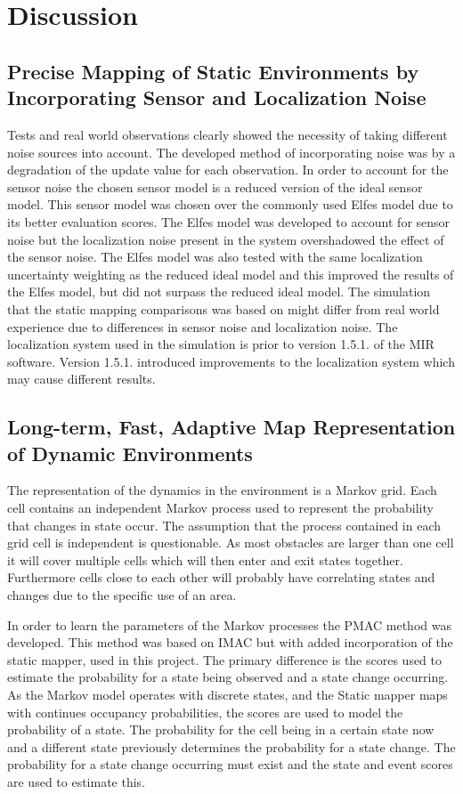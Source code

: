 \section{Discussion}

 

\subsection{Precise Mapping of Static Environments by Incorporating Sensor and Localization Noise}
Tests and real world observations clearly showed the necessity of taking different noise sources into account. 
The developed method of incorporating noise was by a degradation of the update value for each observation. 
In order to account for the sensor noise the chosen sensor model is a reduced version of the ideal sensor model. 
This sensor model was chosen over the commonly used Elfes model due to its better evaluation scores. 
The Elfes model was developed to account for sensor noise but the localization noise present in the system overshadowed the effect of the sensor noise. 
The Elfes model was also tested with the same localization uncertainty weighting as the reduced ideal model and this improved the results of the Elfes model, but did not surpass the reduced ideal model. 
The simulation that the static mapping comparisons was based on might differ from real world experience due to differences in sensor noise and localization noise. 
The localization system used in the simulation is prior to version 1.5.1. of the MIR software. 
Version 1.5.1. introduced improvements to the localization system which may cause different results. 

\subsection{Long-term, Fast, Adaptive Map Representation of Dynamic Environments}
The representation of the dynamics in the environment is a Markov grid. 
Each cell contains an independent Markov process used to represent the probability that changes in state occur. 
The assumption that the process contained in each grid cell is independent is questionable. 
As most obstacles are larger than one cell it will cover multiple cells which will then enter and exit states together. 
Furthermore cells close to each other will probably have correlating states and changes due to the specific use of an area. 

In order to learn the parameters of the Markov processes the PMAC method was developed. 
This method was based on IMAC but with added incorporation of the static mapper, used in this project. 
The primary difference is the scores used to estimate the probability for a state being observed and a state change occurring.
As the Markov model operates with discrete states, and the Static mapper maps with continues occupancy probabilities, the scores are used to model the probability of a state. 
The probability for the cell being in a certain state now and a different state previously determines the probability for a state change.
The probability for a state change occurring must exist and the state and event scores are used to estimate this.  

